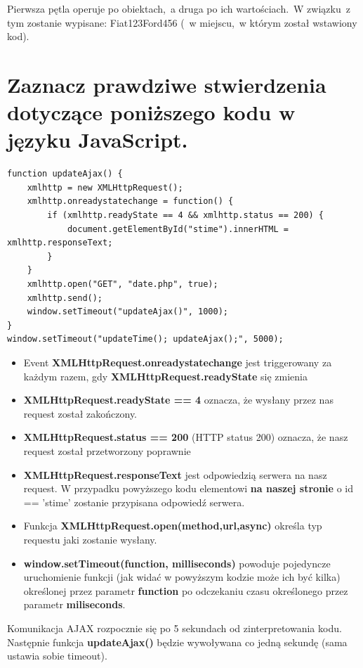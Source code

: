 \vspace{0.4cm}
\noindent
Pierwsza pętla operuje po obiektach,~a druga po ich wartościach.~W związku~z tym zostanie wypisane: Fiat123Ford456 (~w miejscu,~w którym został wstawiony kod).

\section{Zaznacz prawdziwe stwierdzenia dotyczące poniższego kodu w języku JavaScript.}



\begin{lstlisting}
function updateAjax() {
    xmlhttp = new XMLHttpRequest();
    xmlhttp.onreadystatechange = function() {
        if (xmlhttp.readyState == 4 && xmlhttp.status == 200) {
            document.getElementById("stime").innerHTML = xmlhttp.responseText;
        }
    }
    xmlhttp.open("GET", "date.php", true);
    xmlhttp.send();
    window.setTimeout("updateAjax()", 1000);
}
window.setTimeout("updateTime(); updateAjax();", 5000);
\end{lstlisting}

\begin{itemize}
\item{Event \textbf{XMLHttpRequest.onreadystatechange} jest triggerowany za każdym razem, gdy
\textbf{XMLHttpRequest.readyState} się zmienia}

\item{\textbf{XMLHttpRequest.readyState == 4} oznacza, że wysłany przez nas request został zakończony.}

\item{\textbf{XMLHttpRequest.status == 200 } (HTTP status 200) oznacza, że nasz request został przetworzony poprawnie}

\item{\textbf{XMLHttpRequest.responseText} jest odpowiedzią serwera na nasz request. W przypadku powyższego kodu elementowi \textbf{na naszej stronie} o id == 'stime' zostanie przypisana odpowiedź serwera.} 

\item{Funkcja \textbf{XMLHttpRequest.open(method,url,async)} określa typ requestu jaki zostanie wysłany. }

\item{\textbf{window.setTimeout(function, milliseconds)} powoduje pojedyncze uruchomienie funkcji (jak widać w powyższym kodzie może ich być kilka) określonej przez parametr \textbf{function} po odczekaniu czasu określonego przez parametr \textbf{miliseconds}.}

\end{itemize}
Komunikacja AJAX rozpocznie się po 5 sekundach od zinterpretowania kodu. Następnie funkcja \textbf{updateAjax()} będzie wywoływana co jedną sekundę (sama ustawia sobie timeout).



